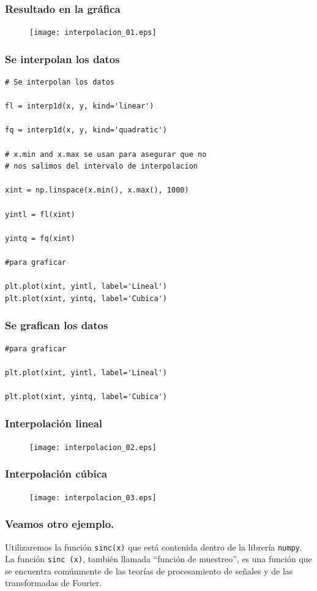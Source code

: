 \begin{frame}
\frametitle{Resultado en la gráfica}
\begin{figure}
\hspace*{-0.2cm}\texttt{[image: interpolacion\_01.eps]}
\end{figure}
\end{frame}
\begin{frame}
\frametitle{Se interpolan los datos}
\begin{lstlisting}[basicstyle=\ttfamily\normalsize, columns=fullflexible]
# Se interpolan los datos

fl = interp1d(x, y, kind='linear')

fq = interp1d(x, y, kind='quadratic')

# x.min and x.max se usan para asegurar que no
# nos salimos del intervalo de interpolacion

xint = np.linspace(x.min(), x.max(), 1000)

yintl = fl(xint)

yintq = fq(xint)

#para graficar

plt.plot(xint, yintl, label='Lineal')
plt.plot(xint, yintq, label='Cubica')
\end{lstlisting}
\end{frame}
\begin{frame}[fragile]
\frametitle{Se grafican los datos}
\begin{lstlisting}[basicstyle=\ttfamily\normalsize, columns=fullflexible]
#para graficar

plt.plot(xint, yintl, label='Lineal')

plt.plot(xint, yintq, label='Cubica')
\end{lstlisting}
\end{frame}
\begin{frame}
\frametitle{Interpolación lineal}
\begin{figure}
\hspace*{-0.2cm}\texttt{[image: interpolacion\_02.eps]}
\end{figure}
\end{frame}
\begin{frame}
\frametitle{Interpolación cúbica}
\begin{figure}
\hspace*{-0.2cm}\texttt{[image: interpolacion\_03.eps]}
\end{figure}
\end{frame}
\begin{frame}
\frametitle{Veamos otro ejemplo.}
Utilizaremos la función \texttt{sinc(x)} que está contenida dentro de la librería \texttt{numpy}.
\\
\bigskip
La función \texttt{sinc (x)}, también llamada ``función de muestreo'', es una función que se encuentra comúnmente de las teorías de procesamiento de señales y de las transformadas de Fourier.
\end{frame}
